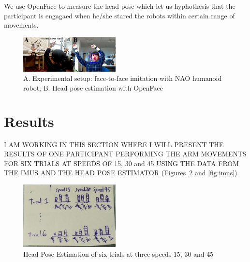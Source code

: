 
We use OpenFace \cite{Baltrusaitis2016} to measure the head pose which
 let us hyphothesis that the participant is engagaed
when he/she stared the robots within certain range of movements.






\begin{figure}[!htb]
\centering
\includegraphics[width=0.45\textwidth]{figures/experiment/fig_w619h233}
\caption[PA]{A. Experimental setup: face-to-face imitation with NAO humanoid robot;
B. Head pose estimation with OpenFace \cite{Baltrusaitis2016}
}
\label{fig:exp}
\end{figure}


\section{Results}
I AM WORKING IN THIS SECTION WHERE I WILL PRESENT THE RESULTS OF
ONE PARTICIPANT PERFORMING THE ARM MOVEMENTS FOR SIX TRIALS
AT SPEEDS OF 15, 30 and 45 USING THE DATA FROM THE IMUS AND THE HEAD POSE
ESTIMATOR (Figures~\ref{fig:hpe} and \ref{fig:imus}).


\begin{figure}[!htb]
\centering
\includegraphics[width=0.45\textwidth]{figures/results/hpe}
\caption[PA]{Head Pose Estimation of six trials at three speeds 15, 30 and 45}
\label{fig:hpe}
\end{figure}




